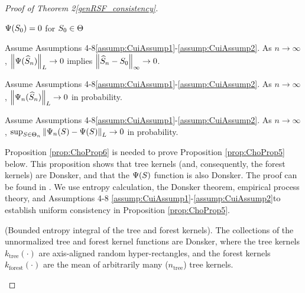 \begin{proof}[Proof of Theorem \ifnum{} 2\else \ref{genRSF_consistency}\fi]

\begin{prop}
\label{prop:ChoProp2}
$\Psi(S_0) = 0$ for $S_0 \in \Theta$
\end{prop}

\begin{prop}
\label{prop:ChoProp3} Assume Assumptions \ifnum{} 4-8\else \ref{assump:CuiAssump1}-\ref{assump:CuiAssump2}\fi. As $n \to \infty$, $\left\lVert\Psi(\widehat{S}_n)\right\rVert_L \to 0$ implies $\left\lVert\widehat{S}_n - S_0\right\rVert_\infty \to 0$.
\end{prop}

\begin{prop}
\label{prop:ChoProp4}
Assume Assumptions \ifnum{} 4-8\else \ref{assump:CuiAssump1}-\ref{assump:CuiAssump2}\fi. As $n \to \infty$, $\left\lVert\Psi_n(\widehat{S}_n)\right\rVert_L \to 0$ in probability.
\end{prop}

\begin{prop}
\label{prop:ChoProp5} 
Assume Assumptions \ifnum{} 4-8\else \ref{assump:CuiAssump1}-\ref{assump:CuiAssump2}\fi. As $n \to \infty$, $\sup_{S \in \Theta_n} \left\lVert\Psi_n(S) - \Psi(S)\right\rVert_L \to 0$ in probability.
\end{prop}





Proposition \ref{prop:ChoProp6} is needed to prove Proposition \ref{prop:ChoProp5} below. This proposition shows that tree kernels (and, consequently, the forest kernels) are Donsker, and that the $\Psi(S)$ function is also Donsker. The proof can be found in \cite{cho_multi-stage_2023}. We use entropy calculation, the Donsker theorem, empirical process theory, and Assumptions \ifnum{} 4-8 \else \ref{assump:CuiAssump1}-\ref{assump:CuiAssump2}\fi to establish uniform consistency in Proposition \ref{prop:ChoProp5}. 

%
\begin{prop}
\label{prop:ChoProp6}(Bounded entropy integral of the tree and forest kernels). The collections of the unnormalized tree and forest kernel functions are Donsker, where the tree kernels $k_{\text{tree}}(\cdot)$ are axis-aligned random hyper-rectangles, and the forest kernels $k_{\text{forest}}(\cdot)$ are the mean of arbitrarily many ($n_{\text{tree}}$) tree kernels.
\end{prop}



\end{proof}

